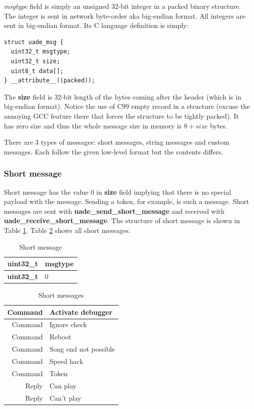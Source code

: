 \documentclass{article}
\begin{document}
\emph{msgtype} field is simply an unsigned 32-bit integer in a packed
binary structure. The integer is sent in network byte-order aka big-endian
format. All integers are sent in big-endian format.
Its C language definition is simply:
\begin{verbatim}
struct uade_msg {
  uint32_t msgtype;
  uint32_t size;
  uint8_t data[];
} __attribute__((packed));
\end{verbatim}

The \textbf{size} field is 32-bit length of the bytes coming after the header
(which is in big-endian format).
Notice the use of C99 empty record in a structure (excuse the annoying GCC
feature there that forces the structure to be tightly packed). It has zero
size and thus the whole message size in memory is $8 + size$ bytes.

There are 3 types of messages: short messages, string messages and custom
messages. Each follow the given low-level format but the contents differs.

\subsubsection{Short message}

Short message has the value $0$ in \textbf{size} field implying that there is
no special payload with the message. Sending a token, for example, is such
a message. Short messages are sent with \textbf{uade\_send\_short\_message}
and received with \textbf{uade\_receive\_short\_message}. The structure
of short message is shown in Table \ref{tab:short_message}.
Table \ref{tab:short_messages} shows all short messages.

\begin{table}
\begin{center}
\caption{Short message}
\label{tab:short_message}
\begin{tabular}{|r|l|}
\hline
\textbf{uint32\_t} & msgtype\\
\hline
\textbf{uint32\_t} & 0 \\
\hline
\end{tabular}
\end{center}
\end{table}

\begin{table}
\begin{center}
\caption{Short messages}
\label{tab:short_messages}
\begin{tabular}{|r|l|}
\hline
Command & Activate debugger\\
\hline
Command & Ignore check\\
\hline
Command & Reboot \\
\hline
Command & Song end not possible \\
\hline
Command & Speed hack \\
\hline
Command & Token \\
\hline
Reply & Can play\\
\hline
Reply & Can't play\\
\hline
\end{tabular}
\end{center}
\end{table}
\end{document}
